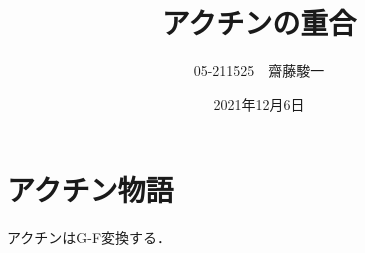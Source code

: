 \documentclass[a4paper,11pt]{jsarticle}
\begin{document}
\title{アクチンの重合}
\author{05-211525　齋藤駿一}
\date{2021年12月6日}
\maketitle

\section{アクチン物語}

アクチンはG-F変換する．
\end{document}
